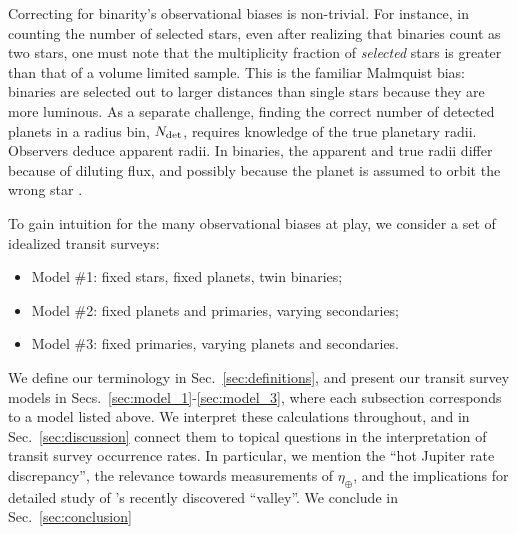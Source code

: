 Correcting for binarity's observational biases is non-trivial.
For instance, in counting the number of selected stars, even after realizing 
that binaries count as two stars, one must note that the multiplicity 
fraction of {\it selected} stars is greater than that of a volume limited 
sample.
This is the familiar Malmquist bias: binaries are selected out to larger 
distances than single stars because they are more luminous.
As a separate challenge, finding the correct number of detected planets in a 
radius bin, $N_{\rm det}$, requires knowledge of the true planetary radii.
Observers deduce apparent radii.
In binaries, the apparent and true radii differ because of diluting flux, 
and possibly because the planet is assumed to orbit the wrong star
\citep[\textit{e.g.},][]{furlan_kepler_2017}.

To gain intuition for the many observational biases at play,
we consider a set of idealized transit surveys:
\begin{itemize}
    \item Model \#1: fixed stars, fixed planets, twin binaries;
    \item Model \#2: fixed planets and primaries, varying secondaries;
    \item Model \#3: fixed primaries, varying planets and secondaries.
\end{itemize}
We define our terminology in Sec.~\ref{sec:definitions}, and present
our transit survey models in Secs.~\ref{sec:model_1}-\ref{sec:model_3}, where 
each subsection corresponds to a model listed above.
We interpret these calculations throughout, and in 
Sec.~\ref{sec:discussion} connect them to topical questions in 
the interpretation of transit survey occurrence rates.
In particular, we mention the ``hot Jupiter rate discrepancy'', the relevance 
towards measurements of $\eta_\oplus$, and the implications for detailed 
study of \citet{fulton_california-_2017}'s recently discovered ``valley''.
We conclude in Sec.~\ref{sec:conclusion}